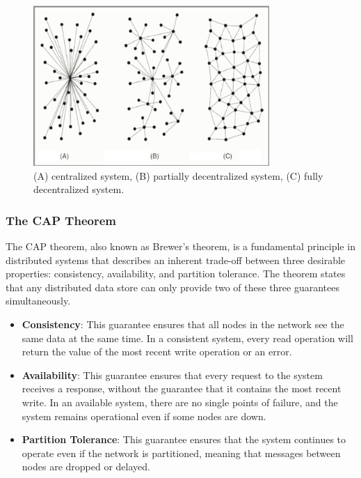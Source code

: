 \begin{figure}[t]
	\begin{center}
		\includegraphics[width=0.8\textwidth]{./figs/distrib-decentralized.png} 
		\caption{(A) centralized system, (B) partially decentralized system, (C) fully decentralized system.}		
		\label{fig:distrib-decentralized}
	\end{center}	
\end{figure}

\subsubsection{The CAP Theorem}\label{the-cap-theorem}

The CAP theorem, also known as Brewer's theorem, is a fundamental
principle in distributed systems that describes an inherent trade-off
between three desirable properties: consistency, availability, and
partition tolerance. The theorem states that any distributed data store
can only provide two of these three guarantees simultaneously.

\begin{itemize}
	\tightlist
	\item
	\textbf{Consistency}: This guarantee ensures that all nodes in the
	network see the same data at the same time. In a consistent system,
	every read operation will return the value of the most recent write
	operation or an error.
	\item
	\textbf{Availability}: This guarantee ensures that every request to
	the system receives a response, without the guarantee that it contains
	the most recent write. In an available system, there are no single
	points of failure, and the system remains operational even if some
	nodes are down.
	\item
	\textbf{Partition Tolerance}: This guarantee ensures that the system
	continues to operate even if the network is partitioned, meaning that
	messages between nodes are dropped or delayed.
\end{itemize}

